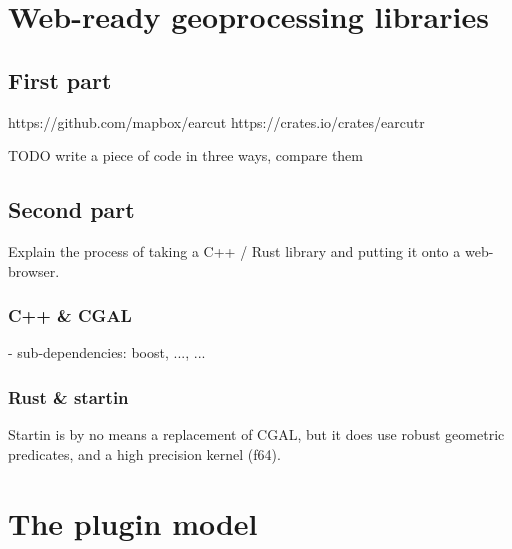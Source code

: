 \newpage

\section{Web-ready geoprocessing libraries}
\label{sec:implementation:compilation}

\subsection{First part}

https://github.com/mapbox/earcut
https://crates.io/crates/earcutr

\begin{note}
TODO write a piece of code in three ways, compare them
\end{note} 

\subsection{Second part}

\begin{note}
Explain the process of taking a C++ / Rust library and putting it onto a web-browser.
\end{note}


\subsubsection*{C++ \& CGAL}

\begin{note}
- sub-dependencies: boost, ..., ...
\end{note}
  
\subsubsection*{Rust \& startin}

\begin{note}
Startin is by no means a replacement of CGAL, 
but it does use robust geometric predicates, and a high precision kernel (f64).
\end{note}


\newpage

\section{The plugin model}
\label{sec:implementation:loading}

